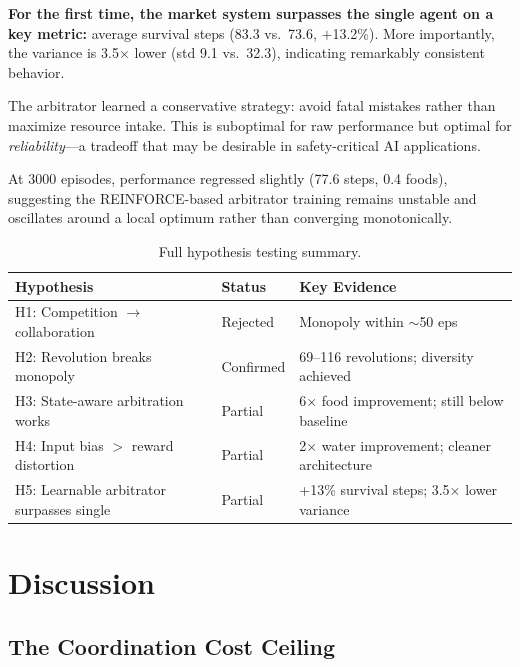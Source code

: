 \documentclass[a4paper,11pt]{article}
\begin{document}
\textbf{For the first time, the market system surpasses the single agent on a key metric:} average survival steps (83.3 vs.\ 73.6, $+$13.2\%). More importantly, the variance is 3.5$\times$ lower (std 9.1 vs.\ 32.3), indicating remarkably consistent behavior.

The arbitrator learned a conservative strategy: avoid fatal mistakes rather than maximize resource intake. This is suboptimal for raw performance but optimal for \textit{reliability}---a tradeoff that may be desirable in safety-critical AI applications.

At 3000 episodes, performance regressed slightly (77.6 steps, 0.4 foods), suggesting the REINFORCE-based arbitrator training remains unstable and oscillates around a local optimum rather than converging monotonically.

\begin{table}[H]
\centering
\caption{Full hypothesis testing summary.}
\label{tab:summary}
\begin{tabular}{llp{5.5cm}}
\toprule
\textbf{Hypothesis} & \textbf{Status} & \textbf{Key Evidence} \\
\midrule
H1: Competition $\rightarrow$ collaboration & Rejected       & Monopoly within $\sim$50 eps \\
H2: Revolution breaks monopoly             & Confirmed      & 69--116 revolutions; diversity achieved \\
H3: State-aware arbitration works          & Partial        & 6$\times$ food improvement; still below baseline \\
H4: Input bias $>$ reward distortion       & Partial        & 2$\times$ water improvement; cleaner architecture \\
H5: Learnable arbitrator surpasses single  & Partial        & +13\% survival steps; 3.5$\times$ lower variance \\
\bottomrule
\end{tabular}
\end{table}

\section{Discussion}

\subsection{The Coordination Cost Ceiling}
\end{document}
